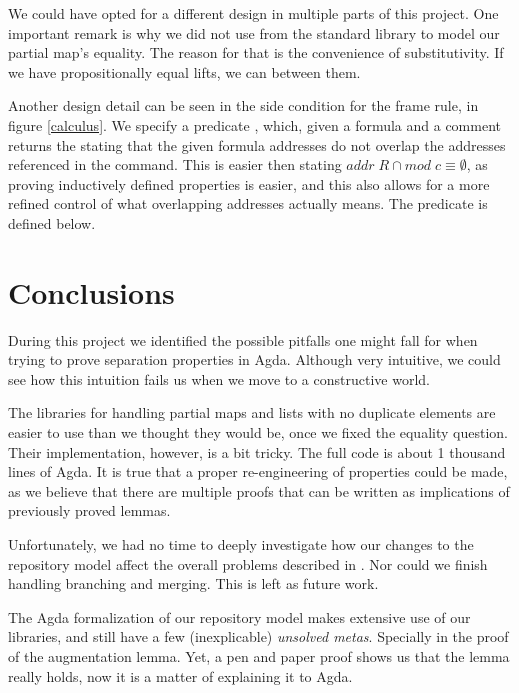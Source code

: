 \documentclass{llncs}
\newcommand{\F}[1]{\AgdaFunction{#1}}
\newcommand{\K}[1]{\AgdaKeyword{#1}}
\begin{document}
We could have opted for a different design in multiple parts of this project. One
important remark is why we did not use \F{Setoid} from the standard library to model
our partial map's equality. The reason for that is the convenience of substitutivity.
If we have propositionally equal lifts, we can \K{rewrite} between them.

Another design detail can be seen in the side condition for the frame rule, in figure \ref{calculus}.
We specify a predicate \F{isFrame}, which, given a formula and a comment returns the \F{Set}
stating that the given formula addresses do not overlap the addresses referenced in the command.
This is easier then stating $addr\;R \cap mod\;c \equiv \emptyset$, as proving inductively defined
properties is easier, and this also allows for a more refined control of what
overlapping addresses actually means. The \F{isFrame} predicate is defined below. 


\section{Conclusions}
\label{conclusion}

During this project we identified the possible pitfalls one might fall for
when trying to prove separation properties in Agda. Although very intuitive,
we could see how this intuition fails us when we move to a constructive world.

The libraries for handling partial maps and lists with no duplicate elements
are easier to use than we thought they would be, once we fixed the equality question.
Their implementation, however, is a bit tricky. The full code is about 1 thousand lines
of Agda. It is true that a proper re-engineering of properties could be made, as we believe
that there are multiple proofs that can be written as implications of previously proved
lemmas.

Unfortunately, we had no time to deeply investigate how our changes to the repository
model affect the overall problems described in \citeSwierstra. Nor could we finish
handling branching and merging. This is left as future work.

The Agda formalization of our repository model makes extensive use of our libraries,
and still have a few (inexplicable) \emph{unsolved metas}. Specially in the proof of the
augmentation lemma. Yet, a pen and paper proof shows us that the lemma really holds,
now it is a matter of explaining it to Agda. 



 
\end{document}
